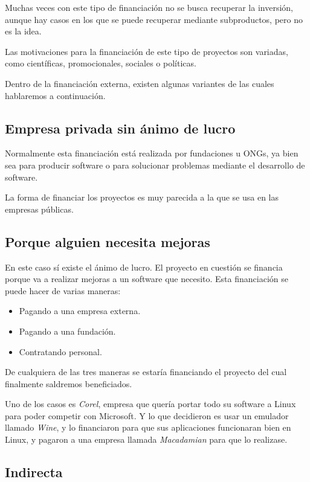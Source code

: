 Muchas veces con este tipo de financiación no se busca recuperar la inversión,
aunque hay casos en los que se puede recuperar mediante subproductos, pero no
es la idea.

Las motivaciones para la financiación de este tipo de proyectos son variadas,
como científicas, promocionales, sociales o políticas.

Dentro de la financiación externa, existen algunas variantes de las cuales
hablaremos a continuación.

\subsection{Empresa privada sin ánimo de lucro}

Normalmente esta financiación está realizada por fundaciones u ONGs, ya bien
sea para producir software o para solucionar problemas mediante el desarrollo de
software.

La forma de financiar los proyectos es muy parecida a la que se usa en las
empresas públicas.


\subsection{Porque alguien necesita mejoras}
En este caso sí existe el ánimo de lucro. El proyecto en cuestión se financia
porque va a realizar mejoras a un software que necesito.
Esta financiación se puede hacer de varias maneras:
\begin{itemize}
  \item Pagando a una empresa externa.
  \item Pagando a una fundación.
  \item Contratando personal.
\end{itemize}

De cualquiera de las tres maneras se estaría financiando el proyecto del cual
finalmente saldremos beneficiados.


Uno de los casos es \emph{Corel}, empresa que quería portar todo su software a Linux para
poder competir con Microsoft. Y lo que decidieron es usar un emulador llamado
\emph{Wine}, y lo financiaron para que sus aplicaciones funcionaran bien en
Linux, y pagaron a una empresa llamada \emph{Macadamian} para que lo realizase.

\subsection{Indirecta}

